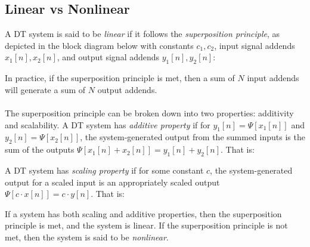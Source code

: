 \documentclass{report}
\begin{document}
\subsection{Linear vs Nonlinear}
A DT system is said to be \emph{linear} if it follows the \emph{superposition principle}, as depicted in the block diagram below with constants $c_1,c_2$, input signal 
addends $x_1[n], x_2[n]$, and output signal addends $y_1[n],y_2[n]$:
\begin{center}
\end{center}
In practice, if the superposition principle is met, then a sum of $N$ input addends will generate a sum of $N$ output addends. \\ \\
The superposition principle can be broken down into two properties: additivity and scalability. 
A DT system has \emph{additive property} if for $y_1[n]=\Psi[x_1[n]]$ and $y_2[n]=\Psi[x_2[n]]$, the system-generated output from 
the summed inputs is the sum of the outputs $\Psi[x_1[n]+x_2[n]]=y_1[n]+y_2[n]$. That is:
\begin{center}
\end{center}
A DT system has \emph{scaling property} if for some constant $c$, the system-generated output for a scaled input is 
an appropriately scaled output $\Psi[c\cdot x[n]]=c\cdot y[n]$. That is:
\begin{center}
\end{center}
If a system has both scaling and additive properties, then the superposition principle is met, and the system is linear. If the superposition principle is not met, 
then the system is said to be \emph{nonlinear}.
\end{document}
